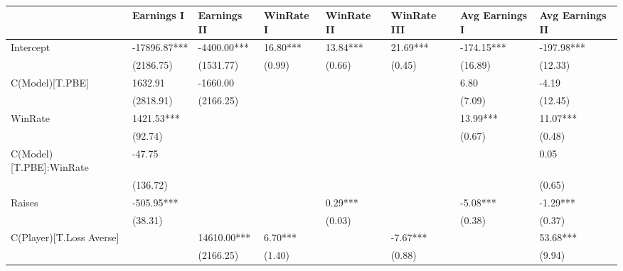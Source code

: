 \begin{table}
\caption{}
\label{}
\begin{center}
\begin{tabular}{llllllll}
\hline
                                           & Earnings I   & Earnings II & WinRate I & WinRate II & WinRate III & Avg Earnings I & Avg Earnings II  \\
\hline
Intercept                                  & -17896.87*** & -4400.00*** & 16.80***  & 13.84***   & 21.69***    & -174.15***     & -197.98***       \\
                                           & (2186.75)    & (1531.77)   & (0.99)    & (0.66)     & (0.45)      & (16.89)        & (12.33)          \\
C(Model)[T.PBE]                            & 1632.91      & -1660.00    &           &            &             & 6.80           & -4.19            \\
                                           & (2818.91)    & (2166.25)   &           &            &             & (7.09)         & (12.45)          \\
WinRate                                    & 1421.53***   &             &           &            &             & 13.99***       & 11.07***         \\
                                           & (92.74)      &             &           &            &             & (0.67)         & (0.48)           \\
C(Model)[T.PBE]:WinRate                    & -47.75       &             &           &            &             &                & 0.05             \\
                                           & (136.72)     &             &           &            &             &                & (0.65)           \\
Raises                                     & -505.95***   &             &           & 0.29***    &             & -5.08***       & -1.29***         \\
                                           & (38.31)      &             &           & (0.03)     &             & (0.38)         & (0.37)           \\
C(Player)[T.Loss Averse]                   &              & 14610.00*** & 6.70***   &            & -7.67***    &                & 53.68***         \\
                                           &              & (2166.25)   & (1.40)    &            & (0.88)      &                & (9.94)           \\

\end{tabular}
\end{center}
\end{table}
